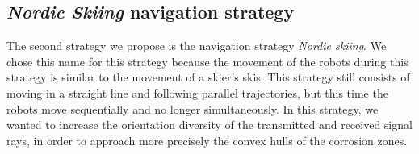 \subsection*{\textit{Nordic Skiing} navigation strategy}

The second strategy we propose is the navigation strategy \textit{Nordic skiing}.
We chose this name for this strategy because the movement of the robots during this strategy is similar to the movement of a skier's skis.
This strategy still consists of moving in a straight line and following parallel trajectories, but this time the robots move sequentially and no longer simultaneously.
In this strategy, we wanted to increase the orientation diversity of the transmitted and received signal rays, in order to approach more precisely the convex hulls of the corrosion zones.

